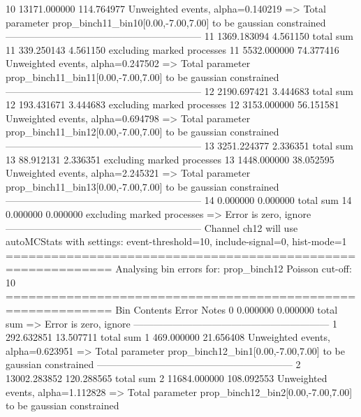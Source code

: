 10         13171.000000    114.764977      Unweighted events, alpha=0.140219
  => Total parameter prop_binch11_bin10[0.00,-7.00,7.00] to be gaussian constrained
------------------------------------------------------------
11         1369.183094     4.561150        total sum                     
11         339.250143      4.561150        excluding marked processes    
11         5532.000000     74.377416       Unweighted events, alpha=0.247502
  => Total parameter prop_binch11_bin11[0.00,-7.00,7.00] to be gaussian constrained
------------------------------------------------------------
12         2190.697421     3.444683        total sum                     
12         193.431671      3.444683        excluding marked processes    
12         3153.000000     56.151581       Unweighted events, alpha=0.694798
  => Total parameter prop_binch11_bin12[0.00,-7.00,7.00] to be gaussian constrained
------------------------------------------------------------
13         3251.224377     2.336351        total sum                     
13         88.912131       2.336351        excluding marked processes    
13         1448.000000     38.052595       Unweighted events, alpha=2.245321
  => Total parameter prop_binch11_bin13[0.00,-7.00,7.00] to be gaussian constrained
------------------------------------------------------------
14         0.000000        0.000000        total sum                     
14         0.000000        0.000000        excluding marked processes    
  => Error is zero, ignore      
------------------------------------------------------------
Channel ch12 will use autoMCStats with settings: event-threshold=10, include-signal=0, hist-mode=1
============================================================
Analysing bin errors for: prop_binch12
Poisson cut-off: 10
============================================================
Bin        Contents        Error           Notes                         
0          0.000000        0.000000        total sum                     
  => Error is zero, ignore      
------------------------------------------------------------
1          292.632851      13.507711       total sum                     
1          469.000000      21.656408       Unweighted events, alpha=0.623951
  => Total parameter prop_binch12_bin1[0.00,-7.00,7.00] to be gaussian constrained
------------------------------------------------------------
2          13002.283852    120.288565      total sum                     
2          11684.000000    108.092553      Unweighted events, alpha=1.112828
  => Total parameter prop_binch12_bin2[0.00,-7.00,7.00] to be gaussian constrained
